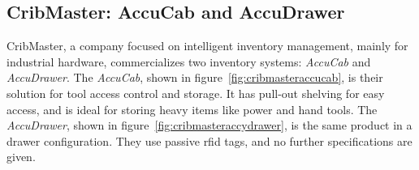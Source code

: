 \subsection{CribMaster: AccuCab and AccuDrawer}

CribMaster, a company focused on intelligent inventory management, mainly for industrial hardware, commercializes two inventory systems: \emph{AccuCab} and \emph{AccuDrawer}.
The \emph{AccuCab}, shown in figure~\ref{fig:cribmasteraccucab}, is their solution for tool access control and storage. It has pull-out shelving for easy access, and is ideal for storing heavy items like power and hand tools.
The \emph{AccuDrawer}, shown in figure~\ref{fig:cribmasteraccydrawer}, is the same product in a drawer configuration.
They use passive \ac{rfid} tags, and no further specifications are given.


